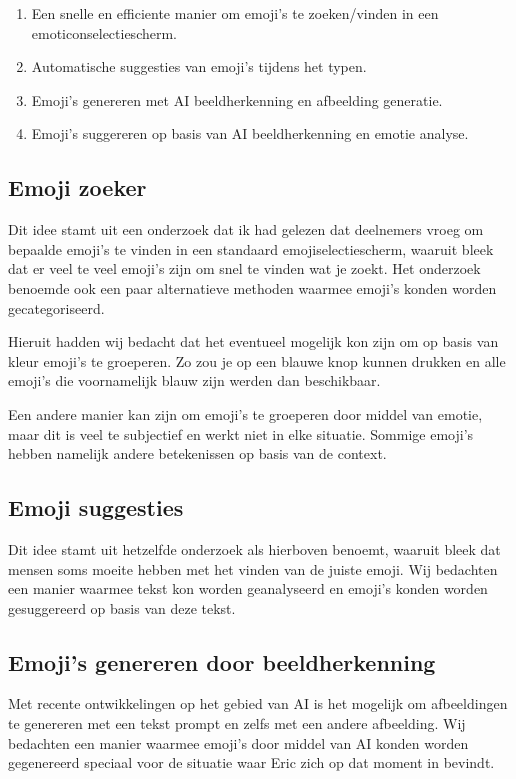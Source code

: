 \documentclass[12pt]{article}
\begin{document}
\begin{enumerate}
	\item Een snelle en efficiente manier om emoji's te zoeken/vinden in een emoticonselectiescherm.
	\item Automatische suggesties van emoji's tijdens het typen.
	\item Emoji's genereren met AI beeldherkenning en afbeelding generatie.
	\item Emoji's suggereren op basis van AI beeldherkenning en emotie analyse.
\end{enumerate}

\subsection{Emoji zoeker}

Dit idee stamt uit een onderzoek dat ik had gelezen dat deelnemers vroeg om bepaalde emoji's te vinden in een standaard emojiselectiescherm, waaruit bleek dat er veel te veel emoji's zijn om snel te vinden wat je zoekt.
Het onderzoek benoemde ook een paar alternatieve methoden waarmee emoji's konden worden gecategoriseerd.

Hieruit hadden wij bedacht dat het eventueel mogelijk kon zijn om op basis van kleur emoji's te groeperen.
Zo zou je op een blauwe knop kunnen drukken en alle emoji's die voornamelijk blauw zijn werden dan beschikbaar.

Een andere manier kan zijn om emoji's te groeperen door middel van emotie, maar dit is veel te subjectief en werkt niet in elke situatie.
Sommige emoji's hebben namelijk andere betekenissen op basis van de context.

\subsection{Emoji suggesties}

Dit idee stamt uit hetzelfde onderzoek als hierboven benoemt, waaruit bleek dat mensen soms moeite hebben met het vinden van de juiste emoji.
Wij bedachten een manier waarmee tekst kon worden geanalyseerd en emoji's konden worden gesuggereerd op basis van deze tekst.

\subsection{Emoji's genereren door beeldherkenning}

Met recente ontwikkelingen op het gebied van AI is het mogelijk om afbeeldingen te genereren met een tekst prompt en zelfs met een andere afbeelding.
Wij bedachten een manier waarmee emoji's door middel van AI konden worden gegenereerd speciaal voor de situatie waar Eric zich op dat moment in bevindt.
\end{document}
